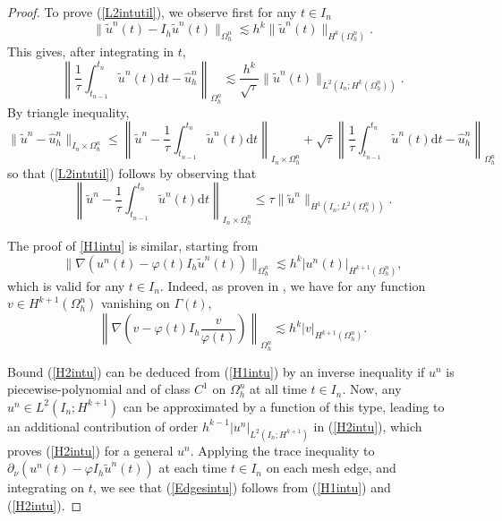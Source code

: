 \documentclass[11pt,a4paper]{article}
\theoremstyle{plain}
\theoremstyle{definition}
\theoremstyle{remark}
\numberwithin{equation}{section}
\newcommand{\dt}{\mathrm{d}t}
\begin{document}
\begin{proof}
	To prove (\ref{L2intutil}), we observe first for any $t \in I_n$
	\[ \| \tilde{u}^n (t) - I_h  \tilde{u}^n (t) \|_{\Omega_h^n} \lesssim h^k
	\| \tilde{u}^n (t) \|_{H^k (\Omega^n_h)}. \]
	This gives, after integrating in $t$,
	\[ \left\|  \frac{1}{\tau}  \int_{t_{n - 1}}^{t_n}  \tilde{u}^n (t)
	\dt - \hat{u}^n_h \right\|_{\Omega_h^n} \lesssim
	\frac{h^k}{\sqrt{\tau}} \| \tilde{u}^n (t) \|_{L^2 (I_n ; H^k
		(\Omega^n_h))}. \]
	By triangle inequality,
	\[ \| \tilde{u}^n - \hat{u}^n_h \|_{I_n \times \Omega_h^n} \leqslant
	\left\|  \tilde{u}^n - \frac{1}{\tau}  \int_{t_{n - 1}}^{t_n}
	\tilde{u}^n (t) \dt \right\|_{I_n \times \Omega_h^n} +
	\sqrt{\tau} \left\|  \frac{1}{\tau}  \int_{t_{n - 1}}^{t_n}
	\tilde{u}^n (t) \dt - \hat{u}^n_h \right\|_{\Omega_h^n} \]
	so that (\ref{L2intutil}) follows by observing that
	\[ \left\|  \tilde{u}^n - \frac{1}{\tau}  \int_{t_{n - 1}}^{t_n}
	\tilde{u}^n (t) \dt \right\|_{I_n \times \Omega_h^n}
	\leqslant \tau \| \tilde{u}^n \|_{H^1 (I_n ; L^2 (\Omega^n_h))}. \]

	The proof of \eqref{H1intu} is similar, starting from
	\[ \| \nabla (u^n (t) - \varphi (t) I_h \tilde{u}^n (t))\|_{\Omega_h^n} \lesssim h^k |u^n (t) |_{H^{k + 1} (\Omega^n_h)}, \]
	which is valid for any $t \in I_n$. Indeed, as proven in \cite{duprez2023phi}, we have
	for any function $v \in H^{k + 1} (\Omega_h^n)$ vanishing on $\Gamma (t)$,
	\begin{equation}\label{fromStokes}
		\left\| \nabla \left( v - \varphi (t) I_h  \frac{v}{\varphi (t)}
		\right) \right\|_{\Omega_h^n} \lesssim h^k | v |_{H^{k + 1} (\Omega^n_h)}.
	\end{equation}


	Bound (\ref{H2intu}) can be deduced from (\ref{H1intu}) by an inverse inequality if $u^n$ is piecewise-polynomial and of class $C^1$ on $\Omega_h^n$ at all time $t\in I_n$. Now, any $u^n\in L^2 (I_n ; H^{k + 1})$ can be approximated by a function of this type, leading to an additional contribution of order $h^{k - 1} |u^n |_{L^2 (I_n ; H^{k + 1})}$ in (\ref{H2intu}), which proves (\ref{H2intu}) for a general $u^n$.  Applying the trace inequality to $\partial_{\nu} (u^n(t) - \varphi I_h \tilde{u}^n(t))$ at each time $t\in I_n$ on each mesh edge, and integrating on $t$, we see that (\ref{Edgesintu}) follows from (\ref{H1intu}) and (\ref{H2intu}).



\end{proof}
\end{document}
